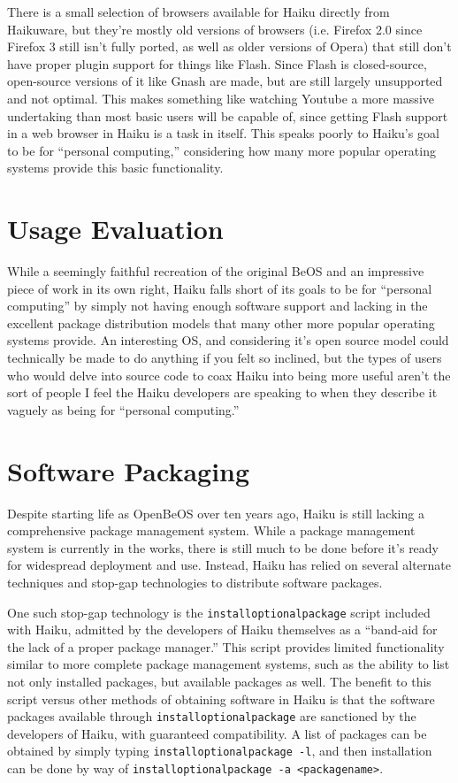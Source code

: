 \documentclass{article}
\begin{document}
There is a small selection of browsers available for Haiku directly
from Haikuware, but they're mostly old versions of browsers
(i.e. Firefox 2.0 since Firefox 3 still isn't fully ported, as well as
older versions of Opera) that still don't have proper plugin support
for things like Flash.  Since Flash is closed-source, open-source
versions of it like Gnash are made, but are still largely unsupported
and not optimal.  This makes something like watching Youtube a more
massive undertaking than most basic users will be capable of, since
getting Flash support in a web browser in Haiku is a task in itself.
This speaks poorly to Haiku's goal to be for ``personal computing,''
considering how many more popular operating systems provide this basic
functionality.

\section{Usage Evaluation}

While a seemingly faithful recreation of the original BeOS and an
impressive piece of work in its own right, Haiku falls short of its
goals to be for ``personal computing'' by simply not having enough
software support and lacking in the excellent package distribution
models that many other more popular operating systems provide.  An
interesting OS, and considering it's open source model could
technically be made to do anything if you felt so inclined, but the
types of users who would delve into source code to coax Haiku into
being more useful aren't the sort of people I feel the Haiku
developers are speaking to when they describe it vaguely as being for
``personal computing.''

\section{Software Packaging}

Despite starting life as OpenBeOS over ten years ago, Haiku is still
lacking a comprehensive package management system. While a package
management system is currently in the works\cite{HaikuFuturePkgMan},
there is still much to be done before it's ready for widespread
deployment and use\cite{HaikuPkgTodo}. Instead, Haiku has relied on
several alternate techniques and stop-gap technologies to distribute
software packages.

One such stop-gap technology is the \texttt{installoptionalpackage}
script included with Haiku, admitted by the developers of Haiku
themselves as a ``band-aid for the lack of a proper package
manager.''\cite{InstallOptionalPackage} This script provides limited
functionality similar to more complete package management systems,
such as the ability to list not only installed packages, but available
packages as well. The benefit to this script versus other methods of
obtaining software in Haiku is that the software packages available
through \texttt{installoptionalpackage} are sanctioned by the
developers of Haiku, with guaranteed compatibility. A list of packages
can be obtained by simply typing \texttt{installoptionalpackage -l},
and then installation can be done by way
of \texttt{installoptionalpackage -a <packagename>}.
\end{document}
